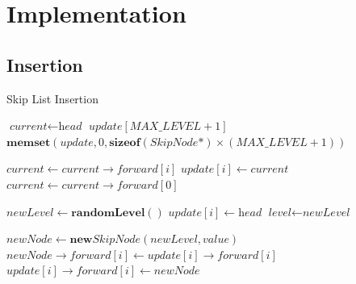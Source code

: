 \documentclass[12pt]{article}
\begin{document}
\section{Implementation}
\subsection{Insertion}

\begin{algorithm}[H]
  \caption{Skip List Insertion}
  \begin{algorithmic}[1]
      \State $\textit{current} \gets \textit{head}$
      \State $\textit{update}[MAX\_LEVEL + 1]$
      \State $\textbf{memset}(\textit{update}, 0, \textbf{sizeof}(\textit{SkipNode*}) \times (MAX\_LEVEL + 1))$
      
              \State $\textit{current} \gets \textit{current}\rightarrow\textit{forward}[i]$
          \EndWhile
          \State $\textit{update}[i] \gets \textit{current}$
      \EndFor
      \State $\textit{current} \gets \textit{current}\rightarrow\textit{forward}[0]$
      
          \State $\textit{newLevel} \gets \textbf{randomLevel}()$
                  \State $\textit{update}[i] \gets \textit{head}$
              \EndFor
              \State $\textit{level} \gets \textit{newLevel}$
          \EndIf
          
          \State $\textit{newNode} \gets \textbf{new} \textit{SkipNode}(\textit{newLevel}, \textit{value})$
              \State $\textit{newNode}\rightarrow\textit{forward}[i] \gets \textit{update}[i]\rightarrow\textit{forward}[i]$
              \State $\textit{update}[i]\rightarrow\textit{forward}[i] \gets \textit{newNode}$
          \EndFor
      \EndIf
  \EndProcedure
  \end{algorithmic}
  \end{algorithm}
\end{document}
